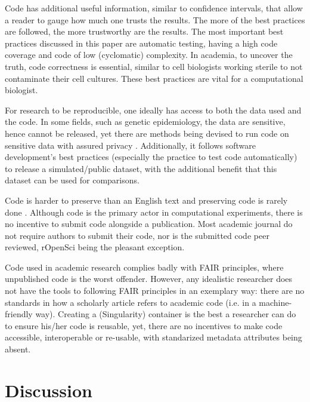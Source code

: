 Code has additional useful information, similar to confidence intervals,
that allow a reader to gauge how much one trusts the results.
The more of the best practices are followed, 
the more trustworthy are the results.
The most important best practices discussed in this paper are
automatic testing, having a high code coverage and code
of low (cyclomatic) complexity.
In academia, to uncover the truth, code correctness is essential,
similar to cell biologists working sterile to not contaminate their
cell cultures.
These best practices are vital for a computational biologist.

For research to be reproducible, one ideally has access to
both the data used and the code.
In some fields, such as genetic epidemiology, the data are
sensitive, hence cannot be released,
yet there are methods being devised to run code on sensitive
data with assured privacy \cite{zhang2016review,azencott2018machine}.
Additionally, it follows software development's best practices 
(especially the practice to test code automatically) 
to release a simulated/public dataset, with
the additional benefit that this dataset can be used for comparisons.

Code is harder to preserve than an English text
and preserving code is rarely done \cite{barnes2010publish}.
Although code is the primary actor in computational experiments,
there is no incentive to submit code alongside a publication.
Most academic journal do not require authors to submit their code,
nor is the submitted code peer reviewed, 
rOpenSci \cite{ram2018community} being the pleasant exception.

Code used in academic research complies badly with FAIR principles,
where unpublished code is the worst offender.
However, any idealistic researcher does not have the
tools to following FAIR principles in an exemplary way:
there are no standards in how a scholarly article
refers to academic code (i.e. in a machine-friendly way).
Creating a (Singularity) container is the best a researcher
can do to ensure his/her code is reusable,
yet, there are no incentives to make code accessible, interoperable
or re-usable, with standarized metadata attributes being absent.

\section{Discussion}

